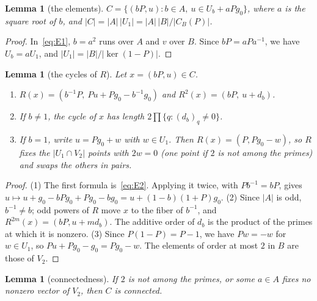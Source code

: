 \documentclass[11pt]{article}
\newtheorem{lemma}[theorem]{Lemma}
\begin{document}
\begin{lemma}[the elements]\label{lem:elements}
$C=\{(bP,u): b\in A,\ u\in U_b+aPg_0\}$, where $a$ is the square root of
$b$, and $|C|=|A|\,|U_1|=|A|\,|B|/|C_B(P)|$.
\end{lemma}

\begin{proof}
In~\eqref{eq:E1}, $b=a^2$ runs over $A$ and $v$ over $B$. Since
$bP=aPa^{-1}$, we have $U_b=aU_1$, and $|U_1|=|B|/|\ker(1-P)|$.
\end{proof}

\begin{lemma}[the cycles of $R$]\label{lem:cycles}
Let $x=(bP,u)\in C$.
\begin{enumerate}
\item $R(x)=(b^{-1}P,\ Pu+Pg_0-b^{-1}g_0)$ and $R^2(x)=(bP,\ u+d_b)$.
\item If $b\ne1$, the cycle of $x$ has length $2\prod\{q:(d_b)_q\ne0\}$.
\item If $b=1$, write $u=Pg_0+w$ with $w\in U_1$. Then $R(x)=(P,Pg_0-w)$,
so $R$ fixes the $|U_1\cap V_2|$ points with $2w=0$ (one point if $2$ is
not among the primes) and swaps the others in pairs.
\end{enumerate}
\end{lemma}

\begin{proof}
(1) The first formula is~\eqref{eq:E2}. Applying it twice, with
$Pb^{-1}=bP$, gives $u\mapsto u+g_0-bPg_0+Pg_0-bg_0=u+(1-b)(1+P)g_0$.
(2) Since $|A|$ is odd, $b^{-1}\ne b$; odd powers of $R$ move $x$ to the
fiber of $b^{-1}$, and $R^{2m}(x)=(bP,u+md_b)$. The additive order of $d_b$
is the product of the primes at which it is nonzero.
(3) Since $P(1-P)=P-1$, we have $Pw=-w$ for $w\in U_1$, so
$Pu+Pg_0-g_0=Pg_0-w$. The elements of order at most $2$ in $B$ are those of
$V_2$.
\end{proof}

\begin{lemma}[connectedness]\label{lem:conn}
If $2$ is not among the primes, or some $a\in A$ fixes no nonzero vector of
$V_2$, then $C$ is connected.
\end{lemma}
\end{document}
